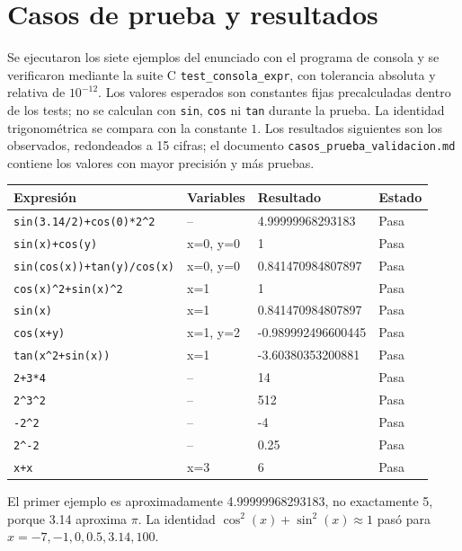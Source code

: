 \documentclass[11pt,a4paper]{article}
\begin{document}
\section{Casos de prueba y resultados}
Se ejecutaron los siete ejemplos del enunciado con el programa de consola y se verificaron mediante la suite C \texttt{test\_consola\_expr}, con tolerancia absoluta y relativa de $10^{-12}$. Los valores esperados son constantes fijas precalculadas dentro de los tests; no se calculan con \texttt{sin}, \texttt{cos} ni \texttt{tan} durante la prueba. La identidad trigonométrica se compara con la constante $1$. Los resultados siguientes son los observados, redondeados a 15 cifras; el documento \texttt{casos\_prueba\_validacion.md} contiene los valores con mayor precisión y más pruebas.
\begin{longtable}{p{5.7cm}p{2.5cm}p{3.8cm}l}\toprule
Expresión & Variables & Resultado & Estado \\\midrule\endhead
\verb|sin(3.14/2)+cos(0)*2^2| & -- & 4.99999968293183 & Pasa \\
\verb|sin(x)+cos(y)| & x=0, y=0 & 1 & Pasa \\
\verb|sin(cos(x))+tan(y)/cos(x)| & x=0, y=0 & 0.841470984807897 & Pasa \\
\verb|cos(x)^2+sin(x)^2| & x=1 & 1 & Pasa \\
\verb|sin(x)| & x=1 & 0.841470984807897 & Pasa \\
\verb|cos(x+y)| & x=1, y=2 & -0.989992496600445 & Pasa \\
\verb|tan(x^2+sin(x))| & x=1 & -3.60380353200881 & Pasa \\
\verb|2+3*4| & -- & 14 & Pasa \\
\verb|2^3^2| & -- & 512 & Pasa \\
\verb|-2^2| & -- & -4 & Pasa \\
\verb|2^-2| & -- & 0.25 & Pasa \\
\verb|x+x| & x=3 & 6 & Pasa \\\bottomrule
\end{longtable}
El primer ejemplo es aproximadamente 4.99999968293183, no exactamente 5, porque 3.14 aproxima $\pi$. La identidad $\cos^2(x)+\sin^2(x)\approx 1$ pasó para $x=-7,-1,0,0.5,3.14,100$.
\end{document}
